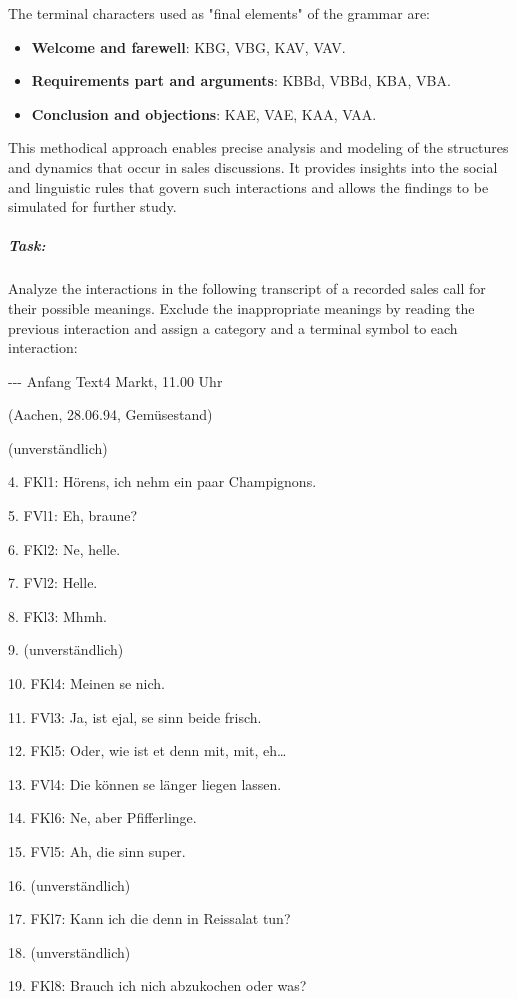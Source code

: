 \documentclass[
]{article}
\begin{document}
The terminal characters used as "final elements" of the grammar are:

\begin{itemize}
\item
  \textbf{Welcome and farewell}: KBG, VBG, KAV, VAV.
\item
  \textbf{Requirements part and arguments}: KBBd, VBBd, KBA, VBA.
\item
  \textbf{Conclusion and objections}: KAE, VAE, KAA, VAA.
\end{itemize}

This methodical approach enables precise analysis and modeling of the
structures and dynamics that occur in sales discussions. It provides
insights into the social and linguistic rules that govern such
interactions and allows the findings to be simulated for further study.

\subparagraph{\texorpdfstring{\textbf{Task:}}{Task:}}\label{task}

Analyze the interactions in the following transcript of a recorded sales
call for their possible meanings. Exclude the inappropriate meanings by
reading the previous interaction and assign a category and a terminal
symbol to each interaction:

-\/-\/- Anfang Text4 Markt, 11.00 Uhr

(Aachen, 28.06.94, Gemüsestand)

(unverständlich)

4. FKl1: Hörens, ich nehm ein paar Champignons.

5. FVl1: Eh, braune?

6. FKl2: Ne, helle.

7. FVl2: Helle.

8. FKl3: Mhmh.

9. (unverständlich)

10. FKl4: Meinen se nich.

11. FVl3: Ja, ist ejal, se sinn beide frisch.

12. FKl5: Oder, wie ist et denn mit, mit, eh\ldots{}

13. FVl4: Die können se länger liegen lassen.

14. FKl6: Ne, aber Pfifferlinge.

15. FVl5: Ah, die sinn super.

16. (unverständlich)

17. FKl7: Kann ich die denn in Reissalat tun?

18. (unverständlich)

19. FKl8: Brauch ich nich abzukochen oder was?
\end{document}
